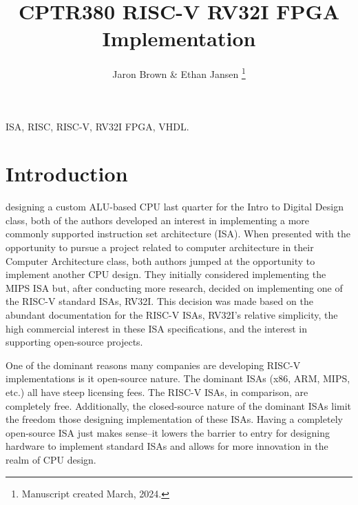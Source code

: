 \documentclass[lettersize,journal]{IEEEtran}
\begin{document}
\title{CPTR380 RISC-V RV32I FPGA Implementation}
\author{Jaron Brown \& Ethan Jansen
\thanks{Manuscript created March, 2024.}}

\maketitle

\begin{abstract}
\color{red}{TBD}
\end{abstract}

\begin{IEEEkeywords}
ISA, RISC, RISC-V, RV32I FPGA, VHDL.
\end{IEEEkeywords}


\section{Introduction}
 designing a custom ALU-based CPU last quarter for the Intro to Digital Design class, 
both of the authors developed an interest in implementing a more commonly supported instruction set architecture (ISA). 
When presented with the opportunity to pursue a project related to computer architecture in their Computer Architecture class, 
both authors jumped at the opportunity to implement another CPU design. They initially considered implementing the MIPS ISA but, 
after conducting more research, decided on implementing one of the RISC-V standard ISAs, RV32I. This decision was made based on the abundant 
documentation for the RISC-V ISAs, RV32I's relative simplicity, the high commercial interest in these ISA specifications,
and the interest in supporting open-source projects.

One of the dominant reasons many companies are developing RISC-V implementations is it open-source nature. 
The dominant ISAs (x86, ARM, MIPS, etc.) all have steep licensing fees. The RISC-V ISAs, in comparison, are completely free. 
Additionally, the closed-source nature of the dominant ISAs limit the freedom those designing implementation of these ISAs. 
Having a completely open-source ISA just makes sense--it lowers the barrier to entry for designing hardware to implement standard 
ISAs and allows for more innovation in the realm of CPU design.  
\end{document}
